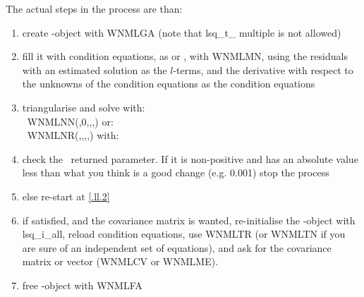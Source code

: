 The actual steps in the process are than:
\begin{enumerate}
\item create \LSQ-object with WNMLGA (note that {{\sc lsq}\_{\sc t}\_{\sc
multiple}} is not allowed) \Mn
\item fill it with condition equations, as
 or , with WNMLMN,
using the residuals with an
estimated solution as the $l$-terms, and the derivative with respect to the
unknowns of the condition equations as the condition equations \Mn
\label{.ll.2}
\item triangularise and solve with:\\
	\Logic\ WNMLNN(\LSQ,0,\Sol,\Error,\Fit) or:\\
	\Logic\ WNMLNR(\LSQ,\Rank,\Sol,\Error,\Fit)  with:
\item check the \Fit\ returned parameter. If it is non-positive and has an
absolute  value less than what you think is a good change (e.g. 0.001) stop
the process \Mn
\item else re-start at \ref{.ll.2} \Mn
\item if satisfied, and the covariance matrix is wanted, re-initialise the
\LSQ-object with {{\sc lsq}\_{\sc i}\_{\sc all}}, reload condition equations,
use \mbox{WNMLTR} (or WNMLTN if you are sure of an independent set of
equations), and ask for the  covariance matrix or vector (WNMLCV or
\mbox{WNMLME}). \Mn
\item free \LSQ-object with WNMLFA  \Mn
\end{enumerate}

